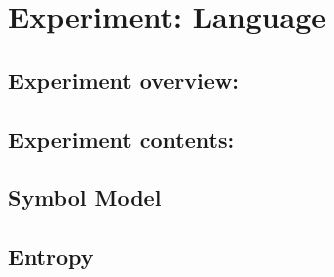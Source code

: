 \section{Experiment: Language}


\subsection{Experiment overview:}

\subsection{Experiment contents:}



\subsection{Symbol Model}

\subsection{Entropy}


